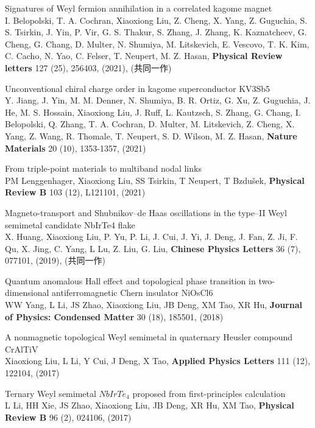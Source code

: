\documentclass[11pt,a4paper,sans]{moderncv} %
\begin{document}
\begin{etaremune}
  \item Signatures of Weyl fermion annihilation in a correlated kagome magnet\\ I. Belopolski, T. A. Cochran, \textcolor{cvblue}{Xiaoxiong Liu}, Z. Cheng, X. Yang, Z. Guguchia, S. S. Tsirkin, J. Yin, P. Vir, G. S. Thakur, S. Zhang, J. Zhang, K. Kaznatcheev, G. Cheng, G. Chang, D. Multer, N. Shumiya, M. Litskevich, E. Vescovo, T. K. Kim, C. Cacho, N. Yao, C. Felser, T. Neupert, M. Z. Hasan, \textbf{Physical Review letters} 127 (25), 256403, (2021), (共同一作)
  \item Unconventional chiral charge order in kagome superconductor KV3Sb5\\ Y. Jiang, J. Yin, M. M. Denner, N. Shumiya, B. R. Ortiz, G. Xu, Z. Guguchia, J. He, M. S. Hossain, \textcolor{cvblue}{Xiaoxiong Liu}, J. Ruff, L. Kautzsch, S. Zhang, G. Chang, I. Belopolski, Q. Zhang, T. A. Cochran, D. Multer, M. Litskevich, Z. Cheng, X. Yang, Z. Wang, R. Thomale, T. Neupert, S. D. Wilson, M. Z. Hasan, \textbf{Nature Materials} 20 (10), 1353-1357, (2021)
  \item From triple-point materials to multiband nodal links\\ PM Lenggenhager, \textcolor{cvblue}{Xiaoxiong Liu}, SS Tsirkin, T Neupert, T Bzdušek, \textbf{Physical Review B} 103 (12), L121101, (2021)
  \item Magneto-transport and Shubnikov–de Haas oscillations in the type–II Weyl semimetal candidate NbIrTe4 flake\\ X. Huang, \textcolor{cvblue}{Xiaoxiong Liu}, P. Yu, P. Li, J. Cui, J. Yi, J. Deng, J. Fan, Z. Ji, F. Qu, X. Jing, C. Yang, L Lu, Z. Liu, G. Liu, \textbf{Chinese Physics Letters} 36 (7), 077101, (2019), (共同一作)
  \item Quantum anomalous Hall effect and topological phase transition in two-dimensional antiferromagnetic Chern insulator NiOsCl6\\ WW Yang, L Li, JS Zhao, \textcolor{cvblue}{Xiaoxiong Liu}, JB Deng, XM Tao, XR Hu, \textbf{Journal of Physics: Condensed Matter} 30 (18), 185501, (2018)
  \item A nonmagnetic topological Weyl semimetal in quaternary Heusler compound CrAlTiV\\ \textcolor{cvblue}{Xiaoxiong Liu}, L Li, Y Cui, J Deng, X Tao, \textbf{Applied Physics Letters} 111 (12), 122104, (2017)
  \item Ternary Weyl semimetal $NbIrTe_4$ proposed from first-principles calculation\\ L Li, HH Xie, JS Zhao, \textcolor{cvblue}{Xiaoxiong Liu}, JB Deng, XR Hu, XM Tao, \textbf{Physical Review B} 96 (2), 024106, (2017)

\end{etaremune}
\end{document}

